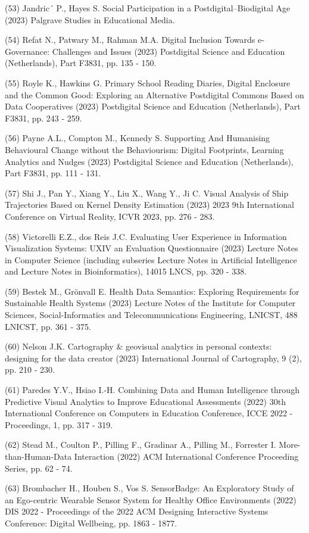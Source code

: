 \documentclass[
	12pt,				%
	oneside,			%
	a4paper,			%
	english,			%
	brazil				%
	]{abntex2ppgsi}
\begin{document}
\begin{apendicesenv}
(53) Jandric´ P., Hayes S. Social Participation in a Postdigital–Biodigital Age (2023) Palgrave Studies in Educational Media.

(54) Refat N., Patwary M., Rahman M.A. Digital Inclusion Towards e-Governance: Challenges and Issues (2023) Postdigital Science and Education (Netherlands), Part F3831, pp. 135 - 150.

(55) Royle K., Hawkins G. Primary School Reading Diaries, Digital Enclosure and the Common Good: Exploring an Alternative Postdigital Commons Based on Data Cooperatives (2023) Postdigital Science and Education (Netherlands), Part F3831, pp. 243 - 259.

(56) Payne A.L., Compton M., Kennedy S. Supporting And Humanising Behavioural Change without the Behaviourism: Digital Footprints, Learning Analytics and Nudges (2023) Postdigital Science and Education (Netherlands), Part F3831, pp. 111 - 131.

(57) Shi J., Pan Y., Xiang Y., Liu X., Wang Y., Ji C. Visual Analysis of Ship Trajectories Based on Kernel Density Estimation (2023) 2023 9th International Conference on Virtual Reality, ICVR 2023, pp. 276 - 283.

(58) Victorelli E.Z., dos Reis J.C. Evaluating User Experience in Information Visualization Systems: UXIV an Evaluation Questionnaire (2023) Lecture Notes in Computer Science (including subseries Lecture Notes in Artificial Intelligence and Lecture Notes in Bioinformatics), 14015 LNCS, pp. 320 - 338.

(59) Bestek M., Grönvall E. Health Data Semantics: Exploring Requirements for Sustainable Health Systems (2023) Lecture Notes of the Institute for Computer Sciences, Social-Informatics and Telecommunications Engineering, LNICST, 488 LNICST, pp. 361 - 375.

(60) Nelson J.K. Cartography \& geovisual analytics in personal contexts: designing for the data creator (2023) International Journal of Cartography, 9 (2), pp. 210 - 230.

(61) Paredes Y.V., Hsiao I.-H. Combining Data and Human Intelligence through Predictive Visual Analytics to Improve Educational Assessments (2022) 30th International Conference on Computers in Education Conference, ICCE 2022 - Proceedings, 1, pp. 317 - 319.

(62) Stead M., Coulton P., Pilling F., Gradinar A., Pilling M., Forrester I. More-than-Human-Data Interaction (2022) ACM International Conference Proceeding Series, pp. 62 - 74.

(63) Brombacher H., Houben S., Vos S. SensorBadge: An Exploratory Study of an Ego-centric Wearable Sensor System for Healthy Office Environments (2022) DIS 2022 - Proceedings of the 2022 ACM Designing Interactive Systems Conference: Digital Wellbeing, pp. 1863 - 1877.


\end{apendicesenv}
\end{document}
